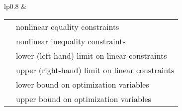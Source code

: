 \documentclass[12pt]{article}
\newcommand{\code}[1]{{\relsize{-0.5}{\tt{{#1}}}}}  %
\numberwithin{equation}{section}
\numberwithin{table}{section}
\numberwithin{figure}{section}
\begin{document}
\begin{table}[!ht]
\begin{threeparttable}
\begin{tabular}{lp{}}
&\begin{tabular}{lp{}}
\code{eqnonlin} & nonlinear equality constraints	\\
\code{ineqnonlin} & nonlinear inequality constraints	\\
\code{mu\_l} & lower (left-hand) limit on linear constraints	\\
\code{mu\_u} & upper (right-hand) limit on linear constraints	\\
\code{lower} & lower bound on optimization variables	\\
\code{upper} & upper bound on optimization variables	\\
\end{tabular}	\\
\bottomrule
\end{tabular}
\end{threeparttable}
\end{table}
\end{document}
